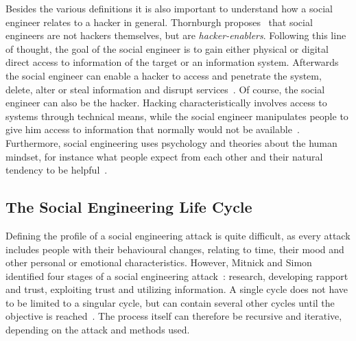 Besides the various definitions it is also important to understand how a
social engineer relates to a hacker in general. Thornburgh
proposes~\cite{thornburgh2004} that social engineers are not hackers
themselves, but are \textit{hacker-enablers}. Following this line of thought,
the goal of the social engineer is to gain either physical or digital direct
access to information of the target or an information system. Afterwards the
social engineer can enable a hacker to access and penetrate the system, delete,
alter or steal information and disrupt services~\cite{thornburgh2004}. Of
course, the social engineer can also be the hacker. Hacking characteristically
involves access to systems through technical means, while the social engineer
manipulates people to give him access to information that normally would not
be available~\cite{jones2004}. Furthermore, social engineering uses psychology
and theories about the human mindset, for instance what people expect from each
other and their natural tendency to be helpful~\cite{jones2004}.


\subsection{The Social Engineering Life Cycle}

Defining the profile of a social engineering attack is quite difficult, as
every attack includes people with their behavioural changes, relating to time,
their mood and other personal or emotional characteristics. However, Mitnick
and Simon identified four stages of a social engineering
attack~\cite{mitnick2003}: research, developing rapport and trust, exploiting
trust and utilizing information. A single cycle does not have to be limited to
a singular cycle, but can contain several other cycles until the objective is
reached~\cite{thornburgh2004}. The process itself can therefore be recursive
and iterative, depending on the attack and methods used.

